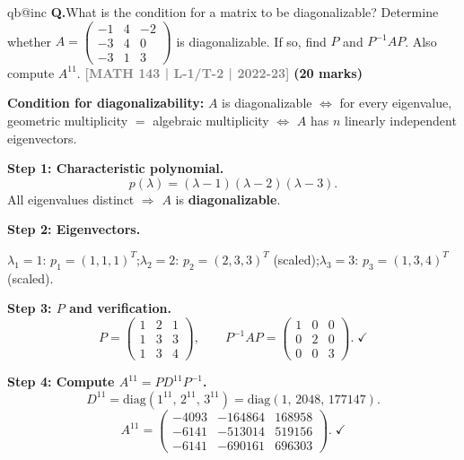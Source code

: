 \documentclass[12pt,a3paper]{article}
\makeatletter
\newcommand{\yr}[1]{\hfill\textcolor{gray}{\small\textbf{[#1]}}}
\newcommand{\mk}[1]{\textcolor{orange!70!black}{\small\textbf{(#1 marks)}}}
\newcounter{qnum}
\newcommand{\Q}[1]{%
  \csname qb@inc\endcsname
  \needspace{4\baselineskip}
  \refstepcounter{qnum}
  \vspace{6pt}
  \noindent\textbf{Q\theqnum.}\enspace #1\par
}
\makeatother
\begin{document}
\Q{What is the condition for a matrix to be diagonalizable? Determine whether $A = \begin{pmatrix} -1 & 4 & -2 \\ -3 & 4 & 0 \\ -3 & 1 & 3 \end{pmatrix}$ is diagonalizable. If so, find $P$ and $P^{-1}AP$. Also compute $A^{11}$.
\yr{MATH 143 | L-1/T-2 | 2022-23} \mk{20}}

\begin{tcolorbox}[enhanced,breakable,
  colback=cE!4,colframe=cE,boxrule=0.8pt,arc=5pt,
  title={\textbf{Answer --- Diagonalizability, $P$, $P^{-1}AP$, and $A^{11}$}},
  fonttitle=\bfseries\color{white},colbacktitle=cE]

\textbf{Condition for diagonalizability:} $A$ is diagonalizable $\Leftrightarrow$ for every eigenvalue, geometric multiplicity $=$ algebraic multiplicity $\Leftrightarrow$ $A$ has $n$ linearly independent eigenvectors.

\medskip
\textbf{Step 1: Characteristic polynomial.}
\[
p(\lambda)=(\lambda-1)(\lambda-2)(\lambda-3).
\]
All eigenvalues distinct $\Rightarrow$ $A$ is \textbf{diagonalizable}.

\textbf{Step 2: Eigenvectors.}

$\lambda_1=1$: $p_1=(1,1,1)^T$;\quad $\lambda_2=2$: $p_2=(2,3,3)^T$ (scaled);\quad $\lambda_3=3$: $p_3=(1,3,4)^T$ (scaled).

\textbf{Step 3: $P$ and verification.}
\[
P=\begin{pmatrix}1&2&1\\1&3&3\\1&3&4\end{pmatrix},\qquad
P^{-1}AP=\begin{pmatrix}1&0&0\\0&2&0\\0&0&3\end{pmatrix}.\;\checkmark
\]

\textbf{Step 4: Compute $A^{11}=PD^{11}P^{-1}$.}
\[
D^{11}=\mathrm{diag}(1^{11},\,2^{11},\,3^{11})=\mathrm{diag}(1,\,2048,\,177147).
\]
\[
A^{11}=\begin{pmatrix}-4093&-164864&168958\\-6141&-513014&519156\\-6141&-690161&696303\end{pmatrix}.\;\checkmark
\]

\end{tcolorbox}
\end{document}
